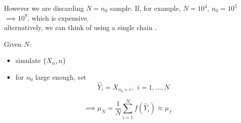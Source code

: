 \documentclass{article}
\begin{document}
	However we are discarding  $N=n_0$ sample. If, for example, $N= 10^4$, $n_0= 10^5$ $\implies 10^9$, which is expensive.\\
	alternatively, we can think of using a single chain . \\
	\begin{algorithm}
		Given $N$:
		\begin{itemize}
			\item simulate $\{X_n, n\}$
			\item  for $n_0$ large enough, set 
			\begin{equation*}
				\hat{Y}_i= X_{n_0+i}, \ \ i = 1,\dots,N 
			\end{equation*}
		\end{itemize}
		\begin{equation*}
			\implies \mu_N = \frac{1}{N}\sum_{i=1}^N f(\hat{Y}_i)\approx \mu_f 
		\end{equation*} 
	\end{algorithm}
	
\end{document}
